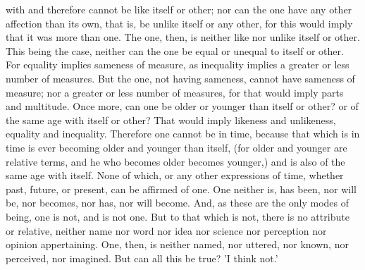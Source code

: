 with and therefore cannot be like itself or other; nor can the one
have any other affection than its own, that is, be unlike itself or any
other, for this would imply that it was more than one. The one, then,
is neither like nor unlike itself or other. This being the case, neither
can the one be equal or unequal to itself or other. For equality implies
sameness of measure, as inequality implies a greater or less number
of measures. But the one, not having sameness, cannot have sameness of
measure; nor a greater or less number of measures, for that would imply
parts and multitude. Once more, can one be older or younger than itself
or other? or of the same age with itself or other? That would imply
likeness and unlikeness, equality and inequality. Therefore one cannot
be in time, because that which is in time is ever becoming older and
younger than itself, (for older and younger are relative terms, and he
who becomes older becomes younger,) and is also of the same age with
itself. None of which, or any other expressions of time, whether past,
future, or present, can be affirmed of one. One neither is, has been,
nor will be, nor becomes, nor has, nor will become. And, as these are
the only modes of being, one is not, and is not one. But to that which
is not, there is no attribute or relative, neither name nor word nor
idea nor science nor perception nor opinion appertaining. One, then, is
neither named, nor uttered, nor known, nor perceived, nor imagined. But
can all this be true? 'I think not.'

